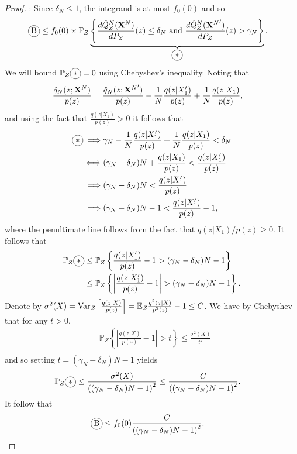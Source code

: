 \begin{proof}
:
Since $\delta_N \leq 1$,
the integrand is at most $f_0(0)$ and so
\begin{align*}
    \encircle{B} &\leq f_0(0) \times \mathbb{P}_Z
    \underbrace{
    \left\lbrace \frac{d\hat{Q}_Z^N(\XN)}{dP_Z}(z) \leq \delta_N \text{ and } \frac{d\hat{Q}_Z^N({\XN}')}{dP_Z}(z) > \gamma_N \right\rbrace}_{\encircle{$*$}}.
\end{align*}
%
We will bound $\mathbb{P}_Z\encircle{$*$} = 0$ using Chebyshev's inequality.
Noting that 
\begin{align*}
    \frac{\hat{q}_N(z;\mathbf{X}^N)}{p(z)} 
    &= \frac{\hat{q}_N(z;{\mathbf{X}^N}')}{p(z)} - \frac{1}{N}\frac{q(z|X'_1)}{p(z)} + \frac{1}{N}\frac{q(z|X_1)}{p(z)}, 
\end{align*}
and using the fact that $\frac{q(z|X_1)}{p(z)} > 0$ it follows that
\begin{align*}
    \encircle{$*$} \implies &\gamma_N - \frac{1}{N}\frac{q(z|X'_1)}{p(z)} + \frac{1}{N}\frac{q(z|X_1)}{p(z)} < \delta_N \\
    \iff & (\gamma_N - \delta_N)N + \frac{q(z|X_1)}{p(z)} < \frac{q(z|X'_1)}{p(z)}\\
    \implies & (\gamma_N-\delta_N)N < \frac{q(z|X'_1)}{p(z)}  \\
\implies & (\gamma_N-\delta_N)N - 1 < \frac{q(z|X'_1)}{p(z)} - 1,
\end{align*}
where the penultimate line follows from the fact that $q(z|X_1)/p(z)\geq0$. It follows that
\begin{align*}
    \mathbb{P}_Z\encircle{$*$} &\leq \mathbb{P}_Z\left\lbrace \frac{q(z|X'_1)}{p(z)} - 1 > (\gamma_N-\delta_N)N - 1 \right\rbrace \\
    &\leq \mathbb{P}_Z\left\lbrace \left|\frac{q(z|X'_1)}{p(z)} - 1\right| > (\gamma_N-\delta_N)N - 1 \right\rbrace. 
\end{align*}
%
Denote by $\sigma^2(X) = \text{Var}_Z\left[\frac{q(z|X)}{p(z)}\right] = \mathbb{E}_Z \frac{q^2(z|X)}{p^2(z)} - 1 \leq C$.
We have by Chebyshev that for any $t>0$,
%
\begin{align*}
    &\mathbb{P}_Z\left\lbrace \left|\frac{q(z|X)}{p(z)} - 1\right| > t \right\rbrace \leq \frac{\sigma^2(X)}{t^2} \\
\end{align*}
and so setting $t=(\gamma_N-\delta_N)N - 1$ yields
\begin{align*}
    \mathbb{P}_Z\encircle{$*$} &\leq \frac{\sigma^2(X)}{\left((\gamma_N-\delta_N)N - 1\right)^2} \leq \frac{C}{\left((\gamma_N-\delta_N)N - 1\right)^2}.
\end{align*}
%
It follow that
\begin{align*}
    \encircle{B} &\leq f_0(0) \frac{C}{\left((\gamma_N-\delta_N)N - 1\right)^2}.
\end{align*}



\end{proof}

